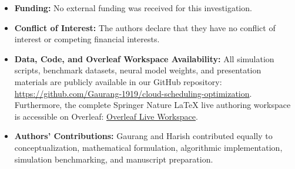 \documentclass[default,sn-mathphys-num]{sn-jnl}
\theoremstyle{thmstyleone}
\theoremstyle{thmstyletwo}
\theoremstyle{thmstylethree}
\begin{document}
\backmatter


\begin{itemize}
    \item \textbf{Funding:} No external funding was received for this investigation.
    \item \textbf{Conflict of Interest:} The authors declare that they have no conflict of interest or competing financial interests.
    \item \textbf{Data, Code, and Overleaf Workspace Availability:} All simulation scripts, benchmark datasets, neural model weights, and presentation materials are publicly available in our GitHub repository: \url{https://github.com/Gaurang-1919/cloud-scheduling-optimization}. Furthermore, the complete Springer Nature LaTeX live authoring workspace is accessible on Overleaf: \href{https://www.overleaf.com/project/6af89462a6b4fbf99f1afded/share#d1d42196d4c6c82f2e81aac36419c0ccbbd0d131f858b99e}{Overleaf Live Workspace}.
    \item \textbf{Authors' Contributions:} Gaurang and Harish contributed equally to conceptualization, mathematical formulation, algorithmic implementation, simulation benchmarking, and manuscript preparation.
\end{itemize}


\end{document}

